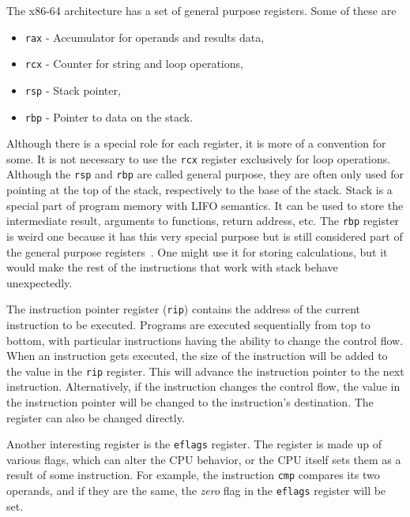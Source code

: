The x86-64 architecture has a set of general purpose registers.
Some of these are
\begin{itemize}
    \item \texttt{rax} - Accumulator for operands and results data,
    \item \texttt{rcx} - Counter for string and loop operations,
    \item \texttt{rsp} - Stack pointer,
    \item \texttt{rbp} - Pointer to data on the stack.
\end{itemize}
Although there is a special role for each register, it is more of a convention
for some. It is not necessary to use the \texttt{rcx} register exclusively for
loop operations. Although the \texttt{rsp} and \texttt{rbp} are called general
purpose, they are often only used for pointing at the top of the stack,
respectively to the base of the stack. Stack is a special part of program
memory with LIFO semantics. It can be used to store the intermediate result,
arguments to functions, return address, etc. The \texttt{rbp} register is weird
one because it has this very special purpose but is still considered part of
the general purpose registers~\cite{intel-manual}. One might use it for storing
calculations, but it would make the rest of the instructions that work with
stack behave unexpectedly.

The instruction pointer register (\texttt{rip}) contains the address of the
current instruction to be executed. Programs are executed sequentially from top
to bottom, with particular instructions having the ability to change the
control flow. When an instruction gets executed, the size of the instruction
will be added to the value in the \texttt{rip} register. This will advance the
instruction pointer to the next instruction. Alternatively, if the instruction
changes the control flow, the value in the instruction pointer will be changed
to the instruction's destination. The register can also be changed directly.

Another interesting register is the \texttt{eflags} register. The register is
made up of various flags, which can alter the CPU behavior, or the CPU itself
sets them as a result of some instruction. For example, the instruction
\texttt{cmp} compares its two operands, and if they are the same, the
\textit{zero} flag in the \texttt{eflags} register will be set.

